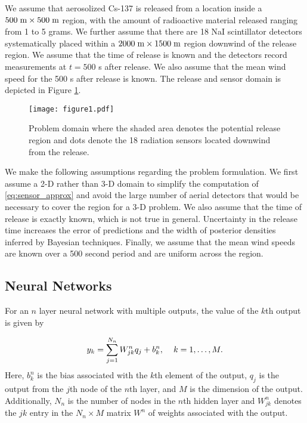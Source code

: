 \documentclass[sn-mathphys-ay]{sn-jnl}
\begin{document}
We assume that aerosolized Cs-137 is released from a location inside a $500 \hspace{1mm} \text{m} \times 500 \hspace{1mm} \text{m}$ region, with the amount of radioactive material released ranging from 1 to 5 grams. We further assume that there are 18 NaI scintillator detectors systematically placed within a $2000 \hspace{1mm} \text{m} \times 1500 \hspace{1mm} \text{m}$ region downwind of the release region. We assume that the time of release is known and the detectors record measurements at $t=500$ s after release. We also assume that the mean wind speed for the 500 s after release is known. The release and sensor domain is depicted in Figure \ref{fig:geom_AFOSR}.

\begin{figure}[!ht]
\centering
\texttt{[image: figure1.pdf]}
 \caption{Problem domain where the shaded area denotes the potential release region and dots denote the 18 radiation sensors located downwind from the release.}
 \label{fig:geom_AFOSR}
  \end{figure}

We make the following assumptions regarding the problem formulation. We first assume a 2-D rather than 3-D domain to simplify the computation of \eqref{eq:sensor_approx} and avoid the large number of aerial detectors that would be necessary to cover the region for a 3-D problem. We also assume that the time of release is exactly known, which is not true in general. Uncertainty in the release time increases the error of predictions and the width of posterior densities inferred by Bayesian techniques. Finally, we assume that the mean wind speeds are known over a 500 second period and are uniform across the region.

\subsection{Neural Networks}
\label{sec:AFOSR_NN}
For an $n$ layer neural network with multiple outputs, the value of the $k$th output is given by

\begin{equation}
\label{eq:hiddenlayer3}
y_k=\sum_{j=1}^{N_n} W_{jk}^nq_j+b_k^n, \hspace{4mm} k=1, \dots, M.
\end{equation}
Here, $b_k^n$ is the bias associated with the $k$th element of the output, $q_j$ is the output from the $j$th node of the $n$th layer, and $M$ is the dimension of the output. Additionally, $N_n$ is the number of nodes in the $n$th hidden layer and $W_{jk}^n$ denotes the $jk$ entry in the $N_n \times M$ matrix $W^n$ of weights associated with the output. 
\end{document}
